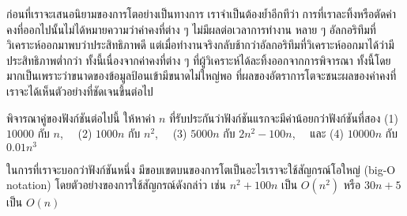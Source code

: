 ก่อน{\wbr}ที่{\wbr}เรา{\wbr}จะ{\wbr}เสนอ{\wbr}นิยาม{\wbr}ของ{\wbr}การ{\wbr}โต{\wbr}อย่าง{\wbr}เป็นทางการ เรา{\wbr}จำเป็น{\wbr}ต้อง{\wbr}ย้ำ{\wbr}อีก{\wbr}ที{\wbr}ว่า{\wbr}
การ{\wbr}ที่{\wbr}เรา{\wbr}ละทิ้ง{\wbr}หรือ{\wbr}ตัด{\wbr}ค่าคงที่{\wbr}ออก{\wbr}ไป{\wbr}นั้น{\wbr}ไม่{\wbr}ได้{\wbr}หมายความ{\wbr}ว่า{\wbr}ค่าคงที่{\wbr}ต่าง ๆ
ไม่{\wbr}มี{\wbr}ผล{\wbr}ต่อ{\wbr}เวลา{\wbr}การ{\wbr}ทำงาน หลาย ๆ อัล{\wbr}กอ{\wbr}ริ{\wbr}ทึม{\wbr}ที่{\wbr}วิเคราะห์{\wbr}ออก{\wbr}มา{\wbr}พบ{\wbr}ว่า{\wbr}ประสิทธิภาพ{\wbr}ดี{\wbr}
แต่{\wbr}เมื่อ{\wbr}ทำงาน{\wbr}จริง{\wbr}กลับ{\wbr}ช้า{\wbr}กว่า{\wbr}อัล{\wbr}กอ{\wbr}ริ{\wbr}ทึม{\wbr}ที่{\wbr}วิเคราะห์{\wbr}ออก{\wbr}มา{\wbr}ได้{\wbr}ว่า{\wbr}มี{\wbr}ประสิทธิภาพ{\wbr}ต่ำ{\wbr}กว่า{\wbr}
ทั้งนี้{\wbr}เนื่องจาก{\wbr}ค่าคงที่{\wbr}ต่าง ๆ ที่{\wbr}ผู้{\wbr}วิเคราะห์{\wbr}ได้{\wbr}ละทิ้ง{\wbr}ออก{\wbr}จาก{\wbr}การ{\wbr}พิจารณา{\wbr}
ทั้งนี้{\wbr}โดยมาก{\wbr}เป็น{\wbr}เพราะว่า{\wbr}ขนาด{\wbr}ของ{\wbr}ข้อมูล{\wbr}ป้อน{\wbr}เข้า{\wbr}มี{\wbr}ขนาด{\wbr}ไม่{\wbr}ใหญ่{\wbr}พอ{\wbr}
ที่{\wbr}ผล{\wbr}ของ{\wbr}อัตรา{\wbr}การ{\wbr}โต{\wbr}จะ{\wbr}ชนะ{\wbr}ผล{\wbr}ของ{\wbr}ค่าคงที่ เรา{\wbr}จะ{\wbr}ได้{\wbr}เห็น{\wbr}ตัวอย่าง{\wbr}ที่{\wbr}ชัดเจน{\wbr}ขึ้น{\wbr}ต่อไป{\wbr}

\begin{quiz}{}
พิจารณา{\wbr}คู่{\wbr}ของ{\wbr}ฟังก์ชัน{\wbr}ต่อไปนี้ ให้{\wbr}หา{\wbr}ค่า $n$ ที่{\wbr}รับประกัน{\wbr}ว่า{\wbr}ฟังก์ชัน{\wbr}แรก{\wbr}จะ{\wbr}มี{\wbr}ค่า{\wbr}น้อย{\wbr}กว่า{\wbr}ฟังก์ชัน{\wbr}ที่{\wbr}สอง{\wbr}
(1) $10000$ กับ $n$, \ \ (2) $1000n$ กับ $n^2$, \ \ (3) $5000n$ กับ $2n^2 -
100n$, \ \ และ (4) $10000n$ กับ $0.01n^3$
\end{quiz}

ใน{\wbr}การ{\wbr}ที่{\wbr}เรา{\wbr}จะ{\wbr}บอก{\wbr}ว่า{\wbr}ฟังก์ชัน{\wbr}หนึ่ง มี{\wbr}ขอบเขต{\wbr}บน{\wbr}ของ{\wbr}การ{\wbr}โต{\wbr}เป็น{\wbr}อะไร{\wbr}เรา{\wbr}จะ{\wbr}ใช้{\wbr}สัญกรณ์{\wbr}โอ{\wbr}ใหญ่{\wbr}
(big-O notation) โดย{\wbr}ตัวอย่าง{\wbr}ของ{\wbr}การ{\wbr}ใช้{\wbr}สัญกรณ์{\wbr}ดัง{\wbr}กล่า่ว เช่น $n^2 + 100n$ เป็น{\wbr}
$O(n^2)$ หรือ $30n + 5$ เป็น $O(n)$ 


